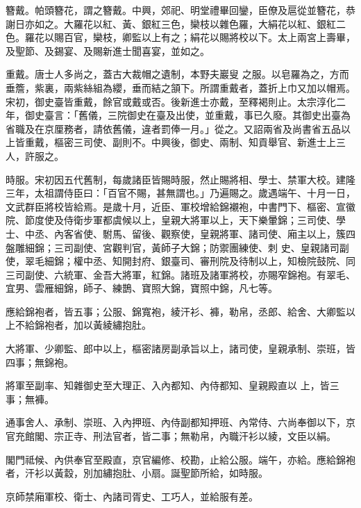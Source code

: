 \begin{pinyinscope}
 簪戴。帕頭簪花，謂之簪戴。中興，郊祀、明堂禮畢回鑾，臣僚及扈從並簪花，恭謝日亦如之。大羅花以紅、黃、銀紅三色，欒枝以雜色羅，大絹花以紅、銀紅二色。羅花以賜百官，欒枝，卿監以上有之；絹花以賜將校以下。太上兩宮上壽畢，及聖節、及錫宴、及賜新進士聞喜宴，並如之。



 重戴。唐士人多尚之，蓋古大裁帽之遺制，本野夫巖叟
 之服。以皂羅為之，方而垂簷，紫裏，兩紫絲組為纓，垂而結之頷下。所謂重戴者，蓋折上巾又加以帽焉。宋初，御史臺皆重戴，餘官或戴或否。後新進士亦戴，至釋褐則止。太宗淳化二年，御史臺言：「舊儀，三院御史在臺及出使，並重戴，事已久廢。其御史出臺為省職及在京厘務者，請依舊儀，違者罰俸一月。」從之。又詔兩省及尚書省五品以上皆重戴，樞密三司使、副則不。中興後，御史、兩制、知貢舉官、新進士上三人，許服之。



 時服。宋初因五代舊制，每歲諸臣皆賜時服，然止賜將相、學士、禁軍大校。建隆三年，太祖謂侍臣曰：「百官不賜，甚無謂也。」乃遍賜之。歲遇端午、十月一日，文武群臣將校皆給焉。是歲十月，近臣、軍校增給錦襯袍，中書門下、樞密、宣徽院、節度使及侍衛步軍都虞候以上，皇親大將軍以上，天下樂暈錦；三司使、學士、中丞、內客省使、駙馬、留後、觀察使，皇親將軍、諸司使、廂主以上，簇四盤雕細錦；三司副使、宮觀判官，黃師子大錦；防禦團練使、刺
 史、皇親諸司副使，翠毛細錦；權中丞、知開封府、銀臺司、審刑院及待制以上，知檢院鼓院、同三司副使、六統軍、金吾大將軍，紅錦。諸班及諸軍將校，亦賜窄錦袍。有翠毛、宜男、雲雁細錦，師子、練鵲、寶照大錦，寶照中錦，凡七等。



 應給錦袍者，皆五事；公服、錦寬袍，綾汗衫、褲，勒帛，丞郎、給舍、大卿監以上不給錦袍者，加以黃綾繡抱肚。



 大將軍、少卿監、郎中以上，樞密諸房副承旨以上，諸司使，皇親承制、崇班，皆四事；無錦袍。



 將軍至副率、知雜御史至大理正、入內都知、內侍都知、皇親殿直以
 上，皆三事；無褲。



 通事舍人、承制、崇班、入內押班、內侍副都知押班、內常侍、六尚奉御以下，京官充館閣、宗正寺、刑法官者，皆二事；無勒帛，內職汗衫以綾，文臣以絹。



 閣門祗候、內供奉官至殿直，京官編修、校勘，止給公服。端午，亦給。應給錦袍者，汗衫以黃縠，別加繡抱肚、小扇。誕聖節所給，如時服。



 京師禁廂軍校、衛士、內諸司胥史、工巧人，並給服有差。




\end{pinyinscope}
